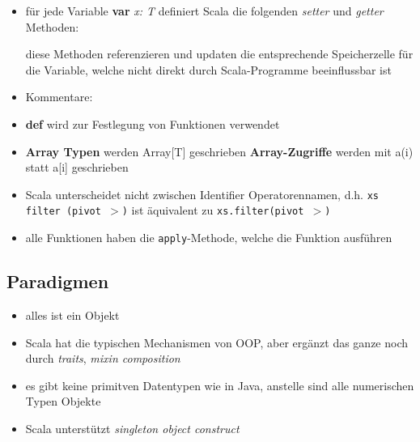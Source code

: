 \begin{itemize}
  
  \item für jede Variable \textbf{var} \textit{x: T} definiert Scala
  die folgenden \textit{setter} und \textit{getter} Methoden:
  
  
  
  diese Methoden referenzieren und updaten die entsprechende Speicherzelle für
  die Variable, welche nicht direkt durch Scala-Programme beeinflussbar ist
  \item Kommentare:

  \item \textbf{def} wird zur Festlegung von Funktionen verwendet
  \item \textbf{Array Typen} werden Array[T] geschrieben \und 
  \textbf{Array-Zugriffe} werden mit a(i) statt a[i] geschrieben
  \item Scala unterscheidet nicht zwischen Identifier \und Operatorennamen,
  d.h. \texttt{xs filter (pivot $>$)} ist äquivalent zu 
  \texttt{xs.filter(pivot $>$)}
  \item alle Funktionen haben die \texttt{apply}-Methode, welche die Funktion 
  ausführen

\end{itemize}


\subsection{Paradigmen}



\begin{itemize}
  \item alles ist ein Objekt
  \item Scala hat die typischen Mechanismen von OOP, aber ergänzt das ganze
  noch durch \textit{traits}, \textit{mixin composition}
  \item es gibt keine primitven Datentypen wie in Java, anstelle sind alle 
  numerischen Typen Objekte
  \item Scala unterstützt \textit{singleton object construct}
\end{itemize}




